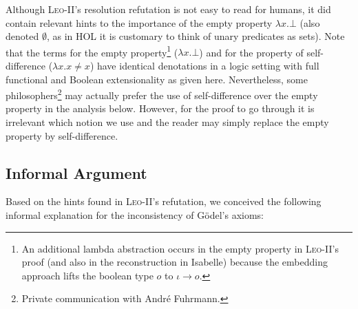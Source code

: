 \documentclass{llncs}
\newcommand{\imp}{{\rightarrow}}
\begin{document}
Although \textsc{Leo-II}'s resolution refutation is not easy to read
for humans, it did contain relevant hints to the importance of the
empty property $\lambda x. \bot$ (also denoted $\emptyset$, as in HOL it is customary to think of unary predicates as sets).
%
Note that the terms for the empty property\footnote{An additional lambda abstraction occurs in the empty property in \textsc{Leo-II}'s proof (and also in the reconstruction in Isabelle) because the embedding approach lifts the boolean type $o$ to $\iota \imp o$.} ($\lambda x. \bot$) and for the property of self-difference ($\lambda x.  x\not=x$) have identical denotations in a logic setting
with full functional and Boolean extensionality as given
here. Nevertheless, some philosophers\footnote{Private communication with Andr\'e Fuhrmann.} may actually prefer the use of
self-difference over the empty property in
the analysis below. However, for the proof to go through it is
irrelevant which notion we use and the reader may simply replace the
empty property by self-difference.



\subsection{Informal Argument} \label{sec:arg1}
Based on the hints found in \textsc{Leo-II}'s refutation, we conceived the following informal explanation for the inconsistency of G\"odel's axioms:
\end{document}
